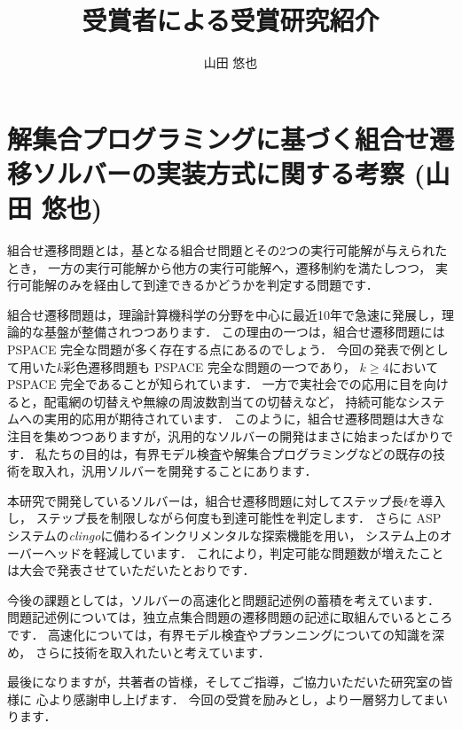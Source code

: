 \documentclass[T, dvipdfmx]{compsoft}
\begin{document}
\title{受賞者による受賞研究紹介}

%
\author{山田 悠也}

\maketitle \thispagestyle {empty}

\section{解集合プログラミングに基づく組合せ遷移ソルバーの実装方式に関する考察 (山田 悠也)}

組合せ遷移問題とは，基となる組合せ問題とその2つの実行可能解が与えられたとき，
一方の実行可能解から他方の実行可能解へ，遷移制約を満たしつつ，
実行可能解のみを経由して到達できるかどうかを判定する問題です．

組合せ遷移問題は，理論計算機科学の分野を中心に最近10年で急速に発展し，理論的な基盤が整備されつつあります．
この理由の一つは，組合せ遷移問題には PSPACE 完全な問題が多く存在する点にあるのでしょう．
今回の発表で例として用いた$k$彩色遷移問題も PSPACE 完全な問題の一つであり，
$k \ge 4$において PSPACE 完全であることが知られています．
一方で実社会での応用に目を向けると，配電網の切替えや無線の周波数割当ての切替えなど，
持続可能なシステムへの実用的応用が期待されています．
このように，組合せ遷移問題は大きな注目を集めつつありますが，汎用的なソルバーの開発はまさに始まったばかりです．
私たちの目的は，有界モデル検査や解集合プログラミングなどの既存の技術を取入れ，汎用ソルバーを開発することにあります．

本研究で開発しているソルバーは，組合せ遷移問題に対してステップ長$t$を導入し，
ステップ長を制限しながら何度も到達可能性を判定します．
さらに ASP システムの\textit{clingo}に備わるインクリメンタルな探索機能を用い，
システム上のオーバーヘッドを軽減しています．
これにより，判定可能な問題数が増えたことは大会で発表させていただいたとおりです．

今後の課題としては，ソルバーの高速化と問題記述例の蓄積を考えています．
問題記述例については，独立点集合問題の遷移問題の記述に取組んでいるところです．
高速化については，有界モデル検査やプランニングについての知識を深め，
さらに技術を取入れたいと考えています．

最後になりますが，共著者の皆様，そしてご指導，ご協力いただいた研究室の皆様に
心より感謝申し上げます．
今回の受賞を励みとし，より一層努力してまいります．
\end{document}
